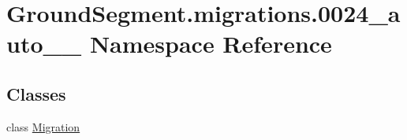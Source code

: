 \hypertarget{namespace_ground_segment_1_1migrations_1_10024__auto__20161204__1335}{}\section{Ground\+Segment.\+migrations.0024\+\_\+auto\+\_\+\_ Namespace Reference}
\label{namespace_ground_segment_1_1migrations_1_10024__auto__20161204__1335}
\subsection*{Classes}
\begin{DoxyCompactItemize}
\item 
class \hyperlink{class_ground_segment_1_1migrations_1_10024__auto__20161204__1335_1_1_migration}{Migration}
\end{DoxyCompactItemize}
